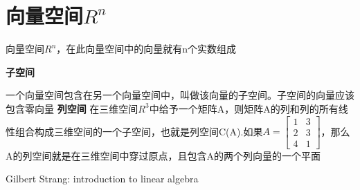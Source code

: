 \documentclass{ctexart}
\begin{document}
	
	
	\section{向量空间\(R^n\)}
	
	向量空间\(R^n\)，在此向量空间中的向量就有n个实数组成
	
	\textbf{子空间}
	
	一个向量空间包含在另一个向量空间中，叫做该向量的子空间。子空间的向量应该包含零向量
	\textbf{列空间}
	在三维空间\(R^3\)中给予一个矩阵A，则矩阵A的列和列的所有线性组合构成三维空间的一个子空间，也就是列空间C(A).如果\(A=\begin{bmatrix}
	1 & 3 \\
	2 & 3 \\
	4 & 1
	\end{bmatrix}\)，那么A的列空间就是在三维空间中穿过原点，且包含A的两个列向量的一个平面

	\begin{thebibliography}{99}
		Gilbert Strang: introduction to linear algebra
	\end{thebibliography}
\end{document}
